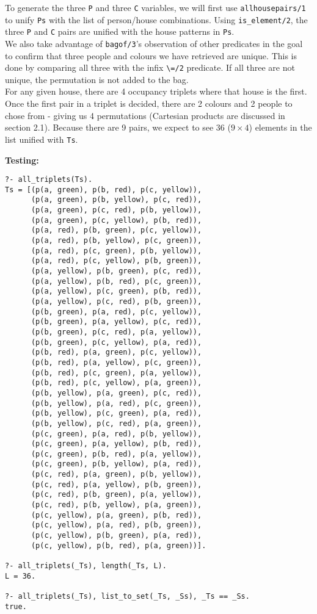 \documentclass[11pt]{article}
\begin{document}
To generate the three {\verb|P|} and three {\verb|C|} variables, we will first use {\verb|allhousepairs/1|} to unify {\verb|Ps|} with the list of person/house combinations. Using {\verb|is_element/2|}, the three {\verb|P|} and {\verb|C|} pairs are unified with the house patterns in {\verb|Ps|}. \\

We also take advantage of {\verb|bagof/3|}'s observation of other predicates in the goal to confirm that three people and colours we have retrieved are unique. This is done by comparing all three with the infix {\verb|\=/2|} predicate. If all three are not unique, the permutation is not added to the bag. \\

For any given house, there are 4 occupancy triplets where that house is the first. Once the first pair in a triplet is decided, there are 2 colours and 2 people to chose from - giving us 4 permutations (Cartesian products are discussed in section 2.1). Because there are 9 pairs, we expect to see 36 ($9 \times 4$) elements in the list unified with {\verb|Ts|}.

\newpage
\textbf{Testing:}
\begin{verbatim}
?- all_triplets(Ts).
Ts = [(p(a, green), p(b, red), p(c, yellow)), 
      (p(a, green), p(b, yellow), p(c, red)), 
      (p(a, green), p(c, red), p(b, yellow)), 
      (p(a, green), p(c, yellow), p(b, red)), 
      (p(a, red), p(b, green), p(c, yellow)), 
      (p(a, red), p(b, yellow), p(c, green)), 
      (p(a, red), p(c, green), p(b, yellow)), 
      (p(a, red), p(c, yellow), p(b, green)), 
      (p(a, yellow), p(b, green), p(c, red)), 
      (p(a, yellow), p(b, red), p(c, green)), 
      (p(a, yellow), p(c, green), p(b, red)), 
      (p(a, yellow), p(c, red), p(b, green)), 
      (p(b, green), p(a, red), p(c, yellow)), 
      (p(b, green), p(a, yellow), p(c, red)), 
      (p(b, green), p(c, red), p(a, yellow)), 
      (p(b, green), p(c, yellow), p(a, red)), 
      (p(b, red), p(a, green), p(c, yellow)), 
      (p(b, red), p(a, yellow), p(c, green)), 
      (p(b, red), p(c, green), p(a, yellow)), 
      (p(b, red), p(c, yellow), p(a, green)), 
      (p(b, yellow), p(a, green), p(c, red)), 
      (p(b, yellow), p(a, red), p(c, green)), 
      (p(b, yellow), p(c, green), p(a, red)), 
      (p(b, yellow), p(c, red), p(a, green)), 
      (p(c, green), p(a, red), p(b, yellow)), 
      (p(c, green), p(a, yellow), p(b, red)), 
      (p(c, green), p(b, red), p(a, yellow)), 
      (p(c, green), p(b, yellow), p(a, red)), 
      (p(c, red), p(a, green), p(b, yellow)), 
      (p(c, red), p(a, yellow), p(b, green)), 
      (p(c, red), p(b, green), p(a, yellow)), 
      (p(c, red), p(b, yellow), p(a, green)), 
      (p(c, yellow), p(a, green), p(b, red)), 
      (p(c, yellow), p(a, red), p(b, green)), 
      (p(c, yellow), p(b, green), p(a, red)), 
      (p(c, yellow), p(b, red), p(a, green))].

?- all_triplets(_Ts), length(_Ts, L).
L = 36.

?- all_triplets(_Ts), list_to_set(_Ts, _Ss), _Ts == _Ss.
true.

\end{verbatim}
\newpage
\end{document}
